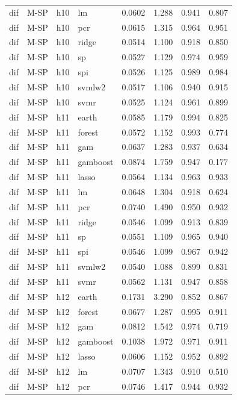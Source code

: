 \begin{ThreePartTable}
\begin{longtable}[t]{llclcccc}
dif & M-SP & h10 & lm & 0.0602 & 1.288 & 0.941 & 0.807\\
dif & M-SP & h10 & pcr & 0.0615 & 1.315 & 0.964 & 0.951\\
dif & M-SP & h10 & ridge & 0.0514 & 1.100 & 0.918 & 0.850\\
dif & M-SP & h10 & sp & 0.0527 & 1.129 & 0.974 & 0.959\\
dif & M-SP & h10 & spi & 0.0526 & 1.125 & 0.989 & 0.984\\
dif & M-SP & h10 & svmlw2 & 0.0517 & 1.106 & 0.940 & 0.915\\
dif & M-SP & h10 & svmr & 0.0525 & 1.124 & 0.961 & 0.899\\
\addlinespace
dif & M-SP & h11 & earth & 0.0585 & 1.179 & 0.994 & 0.825\\
dif & M-SP & h11 & forest & 0.0572 & 1.152 & 0.993 & 0.774\\
dif & M-SP & h11 & gam & 0.0637 & 1.283 & 0.937 & 0.634\\
dif & M-SP & h11 & gamboost & 0.0874 & 1.759 & 0.947 & 0.177\\
dif & M-SP & h11 & lasso & 0.0564 & 1.134 & 0.963 & 0.933\\
dif & M-SP & h11 & lm & 0.0648 & 1.304 & 0.918 & 0.624\\
dif & M-SP & h11 & pcr & 0.0740 & 1.490 & 0.950 & 0.932\\
dif & M-SP & h11 & ridge & 0.0546 & 1.099 & 0.913 & 0.839\\
dif & M-SP & h11 & sp & 0.0551 & 1.109 & 0.965 & 0.940\\
dif & M-SP & h11 & spi & 0.0546 & 1.099 & 0.967 & 0.942\\
dif & M-SP & h11 & svmlw2 & 0.0540 & 1.088 & 0.899 & 0.831\\
dif & M-SP & h11 & svmr & 0.0562 & 1.131 & 0.947 & 0.858\\
\addlinespace
dif & M-SP & h12 & earth & 0.1731 & 3.290 & 0.852 & 0.867\\
dif & M-SP & h12 & forest & 0.0677 & 1.287 & 0.995 & 0.911\\
dif & M-SP & h12 & gam & 0.0812 & 1.542 & 0.974 & 0.719\\
dif & M-SP & h12 & gamboost & 0.1038 & 1.972 & 0.971 & 0.911\\
dif & M-SP & h12 & lasso & 0.0606 & 1.152 & 0.952 & 0.892\\
dif & M-SP & h12 & lm & 0.0707 & 1.343 & 0.910 & 0.510\\
dif & M-SP & h12 & pcr & 0.0746 & 1.417 & 0.944 & 0.932\\

\end{longtable}
\end{ThreePartTable}
